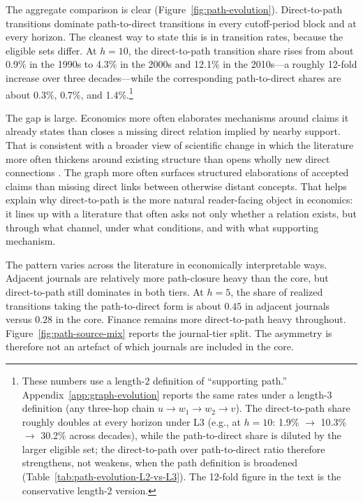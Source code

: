 \documentclass[11pt]{article}
\begin{document}
The aggregate comparison is clear (Figure~\ref{fig:path-evolution}). Direct-to-path transitions dominate path-to-direct transitions in every cutoff-period block and at every horizon. The cleanest way to state this is in transition rates, because the eligible sets differ. At \(h=10\), the direct-to-path transition share rises from about 0.9\% in the 1990s to 4.3\% in the 2000s and 12.1\% in the 2010s---a roughly 12-fold increase over three decades---while the corresponding path-to-direct shares are about 0.3\%, 0.7\%, and 1.4\%.\footnote{These numbers use a length-2 definition of ``supporting path.'' Appendix~\ref{app:graph-evolution} reports the same rates under a length-3 definition (any three-hop chain $u \to w_1 \to w_2 \to v$). The direct-to-path share roughly doubles at every horizon under L3 (e.g., at $h=10$: 1.9\% $\to$ 10.3\% $\to$ 30.2\% across decades), while the path-to-direct share is diluted by the larger eligible set; the direct-to-path over path-to-direct ratio therefore strengthens, not weakens, when the path definition is broadened (Table~\ref{tab:path-evolution-L2-vs-L3}). The 12-fold figure in the text is the conservative length-2 version.}

The gap is large. Economics more often elaborates mechanisms around claims it already states
than closes a missing direct relation implied by nearby support. That is consistent with a
broader view of scientific change in which the literature more often thickens around
existing structure than opens wholly new direct connections
\citep{foster2015tradition,park2023disruptive}. The graph more often surfaces structured elaborations of accepted claims than missing direct
links between otherwise distant concepts. That helps explain why direct-to-path is the more
natural reader-facing object in economics: it lines up with a literature that often asks
not only whether a relation exists, but through what channel, under what conditions, and
with what supporting mechanism.

The pattern varies across the literature in economically interpretable ways. Adjacent journals are relatively more path-closure heavy than the core, but direct-to-path still dominates in both tiers. At \(h=5\), the share of realized transitions taking the path-to-direct form is about \(0.45\) in adjacent journals versus \(0.28\) in the core. Finance remains more direct-to-path heavy throughout. Figure~\ref{fig:path-source-mix} reports the journal-tier split. The asymmetry is therefore not an artefact of which journals are included in the core.
\end{document}
